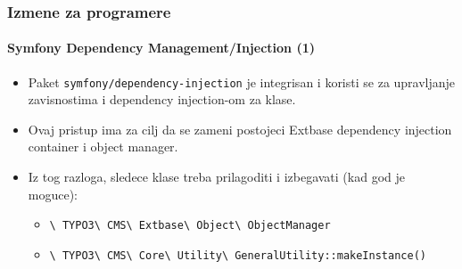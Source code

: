 \begin{frame}[fragile]
	\frametitle{Izmene za programere}
	\framesubtitle{Symfony Dependency Management/Injection (1)}

	\begin{itemize}
		\item Paket \texttt{symfony/dependency-injection} je integrisan i koristi se za
			upravljanje zavisnostima i dependency injection-om za klase.

		\item Ovaj pristup ima za cilj da se zameni postojeci Extbase dependency injection
			container i object manager.

		\item Iz tog razloga, sledece klase treba prilagoditi i izbegavati (kad god je moguce):

			\begin{itemize}\small
				\item \texttt{\textbackslash
					TYPO3\textbackslash
					CMS\textbackslash
					Extbase\textbackslash
					Object\textbackslash
					ObjectManager}
				\item \texttt{\textbackslash
					TYPO3\textbackslash
					CMS\textbackslash
					Core\textbackslash
					Utility\textbackslash
					GeneralUtility::makeInstance()}
			\end{itemize}\normalsize

	\end{itemize}

\end{frame}


